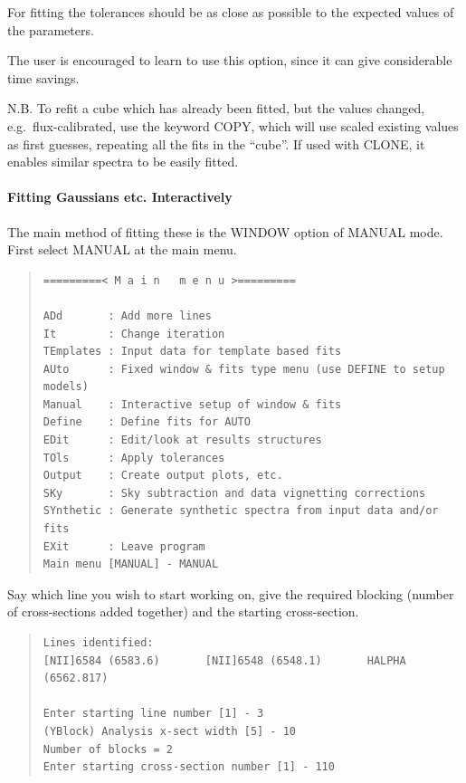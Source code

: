 \documentclass[11pt,twoside]{article}
\begin{document}
For fitting the tolerances should be as close as possible to the
expected values of the parameters.

The user is encouraged to learn to use this option, since
it can give considerable time savings.

N.B. To refit a cube which has already been fitted, but the values
changed, e.g.\ flux-calibrated, use the keyword COPY, which will use
scaled existing values as first guesses, repeating all the fits in the
``cube''.
If used with CLONE, it enables similar spectra to be easily fitted.


\paragraph{Fitting Gaussians etc. Interactively}

The main method of fitting these is the WINDOW option of MANUAL mode.
First select MANUAL at the main menu.

\begin{quote}\begin{verbatim}
=========< M a i n   m e n u >=========

ADd       : Add more lines
It        : Change iteration
TEmplates : Input data for template based fits
AUto      : Fixed window & fits type menu (use DEFINE to setup models)
Manual    : Interactive setup of window & fits
Define    : Define fits for AUTO
EDit      : Edit/look at results structures
TOls      : Apply tolerances
Output    : Create output plots, etc.
SKy       : Sky subtraction and data vignetting corrections
SYnthetic : Generate synthetic spectra from input data and/or fits
EXit      : Leave program
Main menu [MANUAL] - MANUAL
\end{verbatim}\end{quote}

Say which line you wish to start working on, give the required blocking
(number of cross-sections added together) and the starting
cross-section.

\begin{quote}\begin{verbatim}
Lines identified:
[NII]6584 (6583.6)       [NII]6548 (6548.1)       HALPHA (6562.817)

Enter starting line number [1] - 3
(YBlock) Analysis x-sect width [5] - 10
Number of blocks = 2
Enter starting cross-section number [1] - 110
\end{verbatim}\end{quote}
\end{document}
